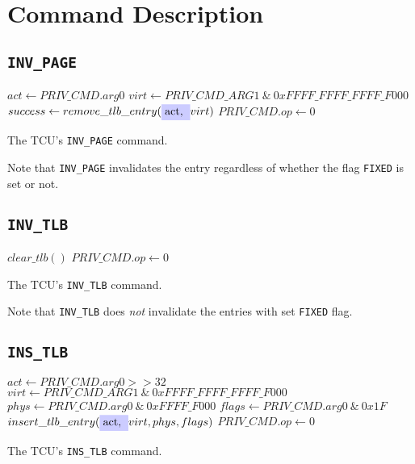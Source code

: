 \section{Command Description}

\subsection{\texttt{INV\_PAGE}}

\begin{algorithm}[H]
    \colorbox{tilemux}{$act \gets PRIV\_CMD.arg0$}\;
    $virt \gets PRIV\_CMD\_ARG1\ \&\ 0xFFFF\_FFFF\_FFFF\_F000$\;
    \BlankLine
    $success \gets remove\_tlb\_entry(\colorbox{tilemux}{act, }virt)$\;
    \BlankLine
    $PRIV\_CMD.op \gets 0$\;
    \caption{The TCU's \texttt{INV\_PAGE} command.}
\end{algorithm}

\noindent Note that \texttt{INV\_PAGE} invalidates the entry regardless of whether the flag
\texttt{FIXED} is set or not.

\subsection{\texttt{INV\_TLB}}

\begin{algorithm}[H]
    $clear\_tlb()$\;
    $PRIV\_CMD.op \gets 0$\;
    \caption{The TCU's \texttt{INV\_TLB} command.}
\end{algorithm}

\noindent Note that \texttt{INV\_TLB} does \emph{not} invalidate the entries with set \texttt{FIXED}
flag.

\subsection{\texttt{INS\_TLB}}

\begin{algorithm}[H]
    \colorbox{tilemux}{$act \gets PRIV\_CMD.arg0 >> 32$}\;
    $virt \gets PRIV\_CMD\_ARG1\ \&\ 0xFFFF\_FFFF\_FFFF\_F000$\;
    $phys \gets PRIV\_CMD.arg0\ \&\ 0xFFFF\_F000$\;
    $flags \gets PRIV\_CMD.arg0\ \&\ 0x1F$\;
    \BlankLine
    \BlankLine
    $insert\_tlb\_entry(\colorbox{tilemux}{act, }virt, phys, flags)$\;
    $PRIV\_CMD.op \gets 0$\;
    \caption{The TCU's \texttt{INS\_TLB} command.}
\end{algorithm}
\extend{}

